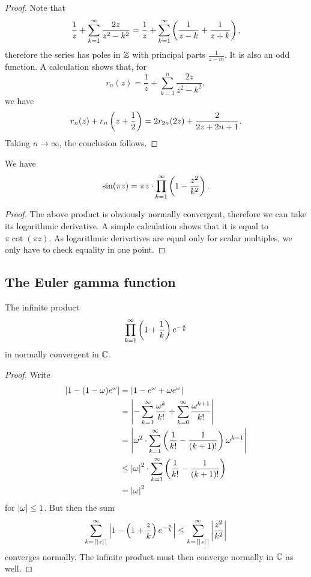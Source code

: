 \begin{proof}
Note that
\[
\frac{1}{z} + \sum_{k=1}^\infty \frac{2z}{z^2 - k^2} =
\frac{1}{z} + \sum_{k=1}^\infty \left(\frac{1}{z-k} + \frac{1}{z+k}\right),
\]
therefore the series has poles in $\mathbb{Z}$ with principal parts
$\frac{1}{z-m}$. It is also an odd function. A calculation shows
that, for
\[
r_n(z) = \frac{1}{z} + \sum_{k=1}^n \frac{2z}{z^2 - k^2},
\]
we have
\[
r_n(z) + r_n \left(z + \frac{1}{2}\right) =
2 r_{2n}(2z) + \frac{2}{2z + 2n + 1}.
\]
Taking $n \to \infty$, the conclusion follows.
\end{proof}

\begin{izrek}
We have
\[
\sin(\pi z) =
\pi z \cdot \prod_{k=1}^\infty \left(1 - \frac{z^2}{k^2}\right).
\]
\end{izrek}

\begin{proof}
The above product is obviously normally convergent, therefore we
can take its logarithmic derivative. A simple calculation shows
that it is equal to $\pi \cot(\pi z)$. As logarithmic derivatives
are equal only for scalar multiples, we only have to check equality
in one point.
\end{proof}

\newpage

\subsection{The Euler gamma function}


\begin{lema}
The infinite product
\[
\prod_{k=1}^\infty \left(1 + \frac{1}{k}\right) e^{-\frac{z}{k}}
\]
in normally convergent in $\mathbb{C}$.
\end{lema}

\begin{proof}
Write
\begin{align*}
\left\lvert 1 - (1-\omega) e^\omega\right\rvert &=
\left\lvert 1 - e^\omega + \omega e^\omega\right\rvert
\\
&=
\left\lvert -\sum_{k=1}^\infty \frac{\omega^k}{k!} +
\sum_{k=0}^\infty \frac{\omega^{k+1}}{k!}\right\rvert
\\
&=
\left\lvert \omega^2 \cdot \sum_{k=1}^\infty
\left(\frac{1}{k!} - \frac{1}{(k+1)!}\right) \omega^{k-1}\right\rvert
\\
&\leq
\left\lvert \omega\right\rvert^2 \cdot \sum_{k=1}^\infty
\left(\frac{1}{k!} - \frac{1}{(k+1)!}\right)
\\
&=
\left\lvert \omega\right\rvert^2
\end{align*}
for $\left\lvert \omega\right\rvert \leq 1$. But then the sum
\[
\sum_{k = \left\lceil \left\lvert z\right\rvert\right\rceil}^\infty
\left\lvert 1 - \left(1 + \frac{z}{k}\right) e^{-\frac{z}{k}}\right\rvert \leq
\sum_{k = \left\lceil \left\lvert z\right\rvert\right\rceil}^\infty \left\lvert \frac{z^2}{k^2}\right\rvert
\]
converges normally. The infinite product must then converge
normally in $\mathbb{C}$ as well.
\end{proof}

